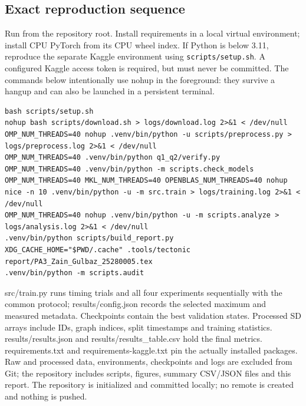\documentclass[11pt,a4paper]{article}
\begin{document}
\subsection{Exact reproduction sequence}
Run from the repository root. Install requirements in a local virtual environment; install CPU PyTorch from its CPU wheel index. If Python is below 3.11, reproduce the separate Kaggle environment using \texttt{scripts/setup.sh}. A configured Kaggle access token is required, but must never be committed. The commands below intentionally use nohup in the foreground: they survive a hangup and can also be launched in a persistent terminal.
\begin{Verbatim}[fontsize=\small,breaklines=true]
bash scripts/setup.sh
nohup bash scripts/download.sh > logs/download.log 2>&1 < /dev/null
OMP_NUM_THREADS=40 nohup .venv/bin/python -u scripts/preprocess.py > logs/preprocess.log 2>&1 < /dev/null
OMP_NUM_THREADS=40 .venv/bin/python q1_q2/verify.py
OMP_NUM_THREADS=40 .venv/bin/python -m scripts.check_models
OMP_NUM_THREADS=40 MKL_NUM_THREADS=40 OPENBLAS_NUM_THREADS=40 nohup nice -n 10 .venv/bin/python -u -m src.train > logs/training.log 2>&1 < /dev/null
OMP_NUM_THREADS=40 nohup .venv/bin/python -u -m scripts.analyze > logs/analysis.log 2>&1 < /dev/null
.venv/bin/python scripts/build_report.py
XDG_CACHE_HOME="$PWD/.cache" .tools/tectonic report/PA3_Zain_Gulbaz_25280005.tex
.venv/bin/python -m scripts.audit
\end{Verbatim}
src/train.py runs timing trials and all four experiments sequentially with the common protocol; results/config.json records the selected maximum and measured metadata. Checkpoints contain the best validation states. Processed SD arrays include IDs, graph indices, split timestamps and training statistics. results/results.json and results/results\_table.csv hold the final metrics. requirements.txt and requirements-kaggle.txt pin the actually installed packages. Raw and processed data, environments, checkpoints and logs are excluded from Git; the repository includes scripts, figures, summary CSV/JSON files and this report. The repository is initialized and committed locally; no remote is created and nothing is pushed.
\end{document}
